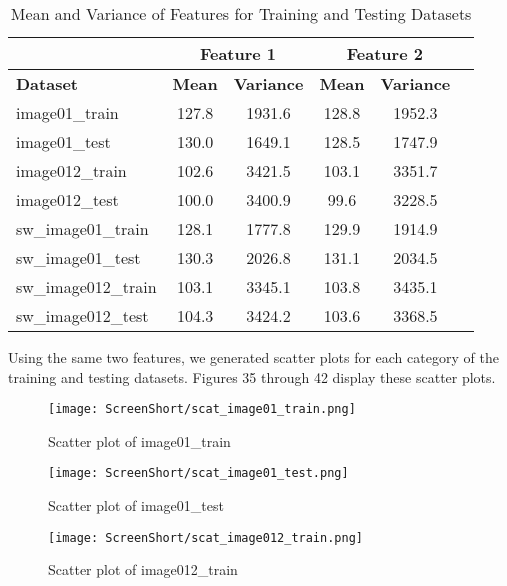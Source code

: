 \documentclass[conference,12pt]{IEEEtran}
\begin{document}
\begin{table}[h!]
\centering
\scriptsize %
\caption{Mean and Variance of Features for Training and Testing Datasets}
\begin{tabular}{|p{2.9cm}|c|c|c|c|c|}
\hline
\textbf{} & \multicolumn{2}{c|}{\textbf{Feature 1}} & \multicolumn{2}{c|}{\textbf{Feature 2}} \\ \hline
\textbf{Dataset} & \textbf{Mean} & \textbf{Variance} & \textbf{Mean} & \textbf{Variance} \\ \hline
image01\_train & 127.8 & 1931.6 & 128.8 & 1952.3 \\ \hline
image01\_test & 130.0 & 1649.1 & 128.5 & 1747.9 \\ \hline
image012\_train & 102.6 & 3421.5 & 103.1 & 3351.7\\ \hline
image012\_test & 100.0 & 3400.9 & 99.6 & 3228.5 \\ \hline
sw\_image01\_train & 128.1 & 1777.8 & 129.9 & 1914.9 \\ \hline
sw\_image01\_test & 130.3 & 2026.8 & 131.1 & 2034.5 \\ \hline
sw\_image012\_train & 103.1 & 3345.1 & 103.8 & 3435.1 \\ \hline
sw\_image012\_test & 104.3 & 3424.2 & 103.6 & 3368.5 \\ \hline
\end{tabular}
\end{table}

Using the same two features, we generated scatter plots for each category of the training and testing datasets. Figures 35 through 42 display these scatter plots.

\begin{figure}[h!]
    \centering
    \texttt{[image: ScreenShort/scat\_image01\_train.png]}
    \caption{Scatter plot of image01\_train}
\end{figure}

\begin{figure}[h!]
    \centering
    \texttt{[image: ScreenShort/scat\_image01\_test.png]}
    \caption{Scatter plot of image01\_test}
\end{figure}

\begin{figure}[h!]
    \centering
    \texttt{[image: ScreenShort/scat\_image012\_train.png]}
    \caption{Scatter plot of image012\_train}
\end{figure}
\end{document}
